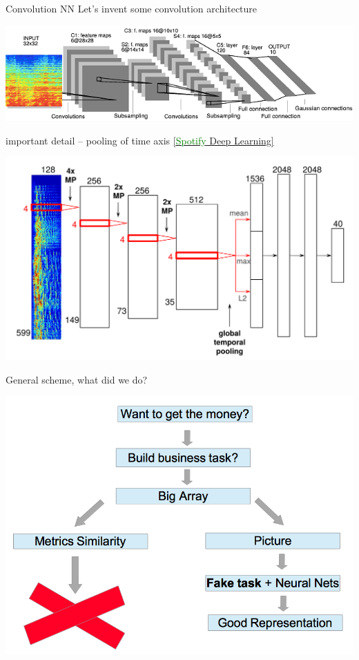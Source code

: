 \documentclass{beamer}
\begin{document}
\begin{frame}{Convolution NN} 
		Let's invent some convolution architecture
		\begin{center}
			\includegraphics[scale=0.5]{img/conv}
		\end{center}
		important detail -- pooling of time axis \href{http://bit.ly/1slJTgi}{[\textcolor{green}{Spotify} Deep Learning]}
		\begin{center}				
			\includegraphics[scale=1.5]{img/rconv}
		\end{center}
\end{frame}

\begin{frame}{General scheme, what did we do?} 	
	\begin{center}				
		\includegraphics[scale=0.3]{img/scheem}
	\end{center}
\end{frame}
\end{document}
